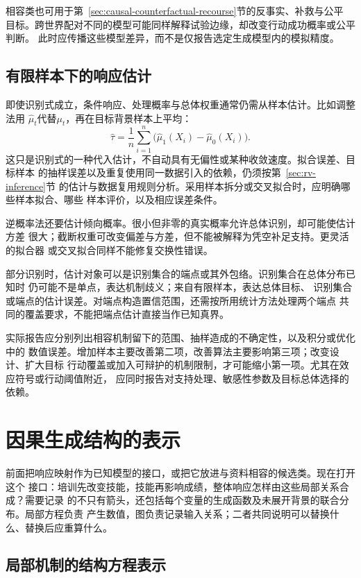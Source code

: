 相容类也可用于第~\ref{sec:causal-counterfactual-recourse}节的反事实、补救与公平
目标。跨世界配对不同的模型可能同样解释试验边缘，却改变行动成功概率或公平判断。
此时应传播这些模型差异，而不是仅报告选定生成模型内的模拟精度。

\subsection{有限样本下的响应估计}
\label{sec:causal-response-estimation}

即使识别式成立，条件响应、处理概率与总体权重通常仍需从样本估计。比如调整法用
\(\widehat\mu_t\)代替\(\mu_t\)，再在目标背景样本上平均：
\[
  \widehat\tau
  =\frac1n\sum_{i=1}^n
    \bigl(\widehat\mu_1(X_i)-\widehat\mu_0(X_i)\bigr).
\]
这只是识别式的一种代入估计，不自动具有无偏性或某种收敛速度。拟合误差、目标样本
的抽样误差以及重复使用同一数据引入的依赖，仍须按第~\ref{sec:rv-inference}节
的估计与数据复用规则分析。采用样本拆分或交叉拟合时，应明确哪些样本拟合、哪些
样本评价，以及相应误差条件。

逆概率法还要估计倾向概率。很小但非零的真实概率允许总体识别，却可能使估计方差
很大；截断权重可改变偏差与方差，但不能被解释为凭空补足支持。更灵活的拟合器
或交叉拟合同样不能修复交换性错误。

部分识别时，估计对象可以是识别集合的端点或其外包络。识别集合在总体分布已知时
仍可能不是单点，表达机制歧义；来自有限样本，表达总体目标、
识别集合或端点的估计误差。对端点构造置信范围，还需按所用统计方法处理两个端点
共同的覆盖要求，不能把端点估计直接当作已知真界。

实际报告应分别列出相容机制留下的范围、抽样造成的不确定性，以及积分或优化中的
数值误差。增加样本主要改善第二项，改善算法主要影响第三项；改变设计、扩大目标
行动覆盖或加入可辩护的机制限制，才可能缩小第一项。尤其在效应符号或行动阈值附近，
应同时报告对支持处理、敏感性参数及目标总体选择的依赖。

\section{因果生成结构的表示}
\label{sec:causal-generating-structure}

前面把响应映射作为已知模型的接口，或把它放进与资料相容的候选类。现在打开这个
接口：培训先改变技能，技能再影响成绩，整体响应怎样由这些局部关系合成？需要记录
的不只有箭头，还包括每个变量的生成函数及未展开背景的联合分布。局部方程负责
产生数值，图负责记录输入关系；二者共同说明可以替换什么、替换后应重算什么。

\subsection{局部机制的结构方程表示}
\label{sec:causal-local-structural-equations}

